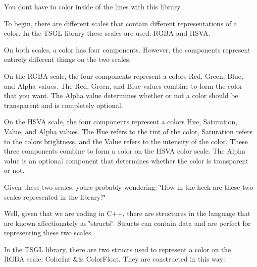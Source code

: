 You don\textquotesingle{}t have to color inside of the lines with this library.

To begin, there are different scales that contain different representations of a color. In the T\+S\+G\+L library these scales are used\+: R\+G\+B\+A and H\+S\+V\+A.

On both scales, a color has four components. However, the components represent entirely different things on the two scales.

On the R\+G\+B\+A scale, the four components represent a color\textquotesingle{}s Red, Green, Blue, and Alpha values. The Red, Green, and Blue values combine to form the color that you want. The Alpha value determines whether or not a color should be transparent and is completely optional.

On the H\+S\+V\+A scale, the four components represent a color\textquotesingle{}s Hue, Saturation, Value, and Alpha values. The Hue refers to the tint of the color, Saturation refers to the color\textquotesingle{}s brightness, and the Value refers to the intensity of the color. These three components combine to form a color on the H\+S\+V\+A color scale. The Alpha value is an optional component that determines whether the color is transparent or not.

Given these two scales, you\textquotesingle{}re probably wondering\+: \char`\"{}\+How in the heck are these two scales represented in the library?\char`\"{}

Well, given that we are coding in C++, there are structures in the language that are known affectionately as \char`\"{}structs\char`\"{}. Structs can contain data and are perfect for representing these two scales.

In the T\+S\+G\+L library, there are two structs used to represent a color on the R\+G\+B\+A scale\+: {\ttfamily Color\+Int} \&\& {\ttfamily Color\+Float}. They are constructed in this way\+:


